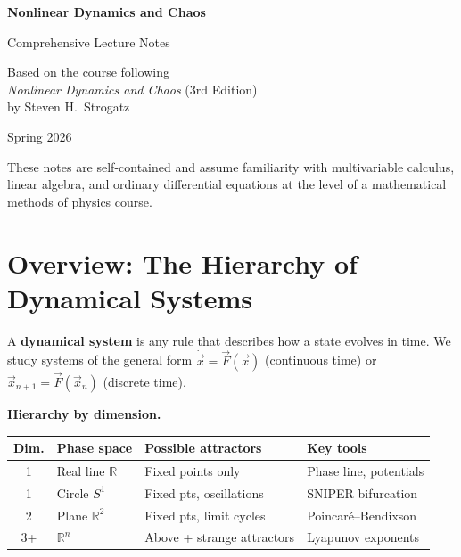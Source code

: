 \documentclass[11pt,letterpaper]{article}
\theoremstyle{definition}
\theoremstyle{plain}
\theoremstyle{remark}
\begin{document}
\begin{titlepage}
\centering
\vspace*{2cm}
{\Huge\bfseries Nonlinear Dynamics and Chaos\par}
\vspace{0.5cm}
{\Large Comprehensive Lecture Notes\par}
\vspace{1.5cm}
{\large Based on the course following\\[6pt]
\textit{Nonlinear Dynamics and Chaos} (3rd Edition)\\[4pt]
by Steven H.\ Strogatz\par}
\vspace{2cm}
{\large Spring 2026\par}
\vfill
{\small These notes are self-contained and assume familiarity with
multivariable calculus, linear algebra, and ordinary differential equations
at the level of a mathematical methods of physics course.\par}
\end{titlepage}

\tableofcontents
\newpage

\section*{Overview: The Hierarchy of Dynamical Systems}

A \textbf{dynamical system} is any rule that describes how a state
evolves in time.  We study systems of the general form
$\dot{\vec{x}} = \vec{F}(\vec{x})$ (continuous time) or
$\vec{x}_{n+1} = \vec{F}(\vec{x}_n)$ (discrete time).

\medskip\noindent\textbf{Hierarchy by dimension.}
\begin{center}
\renewcommand{\arraystretch}{1.4}
\begin{tabular}{@{}clll@{}}
\toprule
\textbf{Dim.} & \textbf{Phase space} & \textbf{Possible attractors}
  & \textbf{Key tools} \\
\midrule
1 & Real line $\mathbb{R}$ & Fixed points only
  & Phase line, potentials \\
1 & Circle $S^1$ & Fixed pts, oscillations
  & SNIPER bifurcation \\
2 & Plane $\mathbb{R}^2$ & Fixed pts, limit cycles
  & Poincar\'e--Bendixson \\
3+ & $\mathbb{R}^n$ & Above + strange attractors
  & Lyapunov exponents \\
\bottomrule
\end{tabular}
\end{center}
\end{document}
